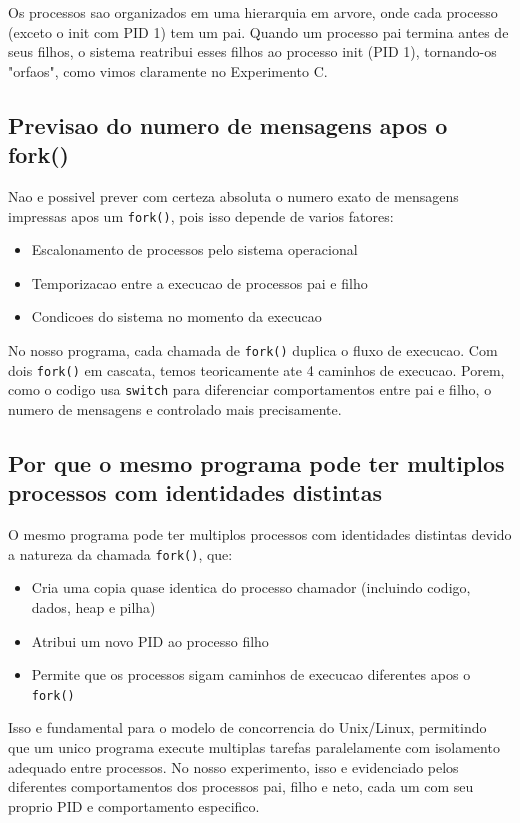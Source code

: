 \documentclass[12pt]{article}
\begin{document}
Os processos sao organizados em uma hierarquia em arvore, onde cada processo (exceto o init com PID 1) tem um pai. Quando um processo pai termina antes de seus filhos, o sistema reatribui esses filhos ao processo init (PID 1), tornando-os "orfaos", como vimos claramente no Experimento C.

\subsection{Previsao do numero de mensagens apos o fork()}

Nao e possivel prever com certeza absoluta o numero exato de mensagens impressas apos um \texttt{fork()}, pois isso depende de varios fatores:

\begin{itemize}
    \item Escalonamento de processos pelo sistema operacional
    \item Temporizacao entre a execucao de processos pai e filho
    \item Condicoes do sistema no momento da execucao
\end{itemize}

No nosso programa, cada chamada de \texttt{fork()} duplica o fluxo de execucao. Com dois \texttt{fork()} em cascata, temos teoricamente ate 4 caminhos de execucao. Porem, como o codigo usa \texttt{switch} para diferenciar comportamentos entre pai e filho, o numero de mensagens e controlado mais precisamente.

\subsection{Por que o mesmo programa pode ter multiplos processos com identidades distintas}

O mesmo programa pode ter multiplos processos com identidades distintas devido a natureza da chamada \texttt{fork()}, que:

\begin{itemize}
    \item Cria uma copia quase identica do processo chamador (incluindo codigo, dados, heap e pilha)
    \item Atribui um novo PID ao processo filho
    \item Permite que os processos sigam caminhos de execucao diferentes apos o \texttt{fork()}
\end{itemize}

Isso e fundamental para o modelo de concorrencia do Unix/Linux, permitindo que um unico programa execute multiplas tarefas paralelamente com isolamento adequado entre processos. No nosso experimento, isso e evidenciado pelos diferentes comportamentos dos processos pai, filho e neto, cada um com seu proprio PID e comportamento especifico.
\end{document}
